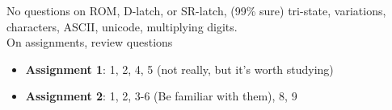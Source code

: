 \documentclass{report}
\begin{document}
No questions on ROM, D-latch, or SR-latch, (99\% sure) tri-state, variations, characters, ASCII, unicode, multiplying digits.
\\
On assignments, review questions
\begin{itemize}
\item \textbf{Assignment 1}: 1, 2, 4, 5 (not really, but it's worth studying)
\item \textbf{Assignment 2}: 1, 2, 3-6 (Be familiar with them), 8, 9
\end{itemize}
\end{document}
